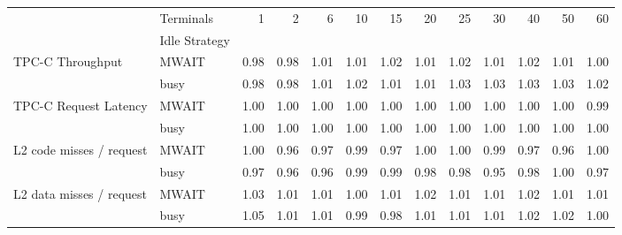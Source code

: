 \begin{tabular}{llrrrrrrrrrrr}
\toprule
                 & Terminals &    1  &    2  &    6  &    10 &    15 &    20 &    25 &    30 &    40 &    50 &    60 \\
{} & Idle Strategy &       &       &       &       &       &       &       &       &       &       &       \\
\midrule
TPC-C Throughput & MWAIT &  0.98 &  0.98 &  1.01 &  1.01 &  1.02 &  1.01 &  1.02 &  1.01 &  1.02 &  1.01 &  1.00 \\
                 & busy &  0.98 &  0.98 &  1.01 &  1.02 &  1.01 &  1.01 &  1.03 &  1.03 &  1.03 &  1.03 &  1.02 \\
TPC-C Request Latency & MWAIT &  1.00 &  1.00 &  1.00 &  1.00 &  1.00 &  1.00 &  1.00 &  1.00 &  1.00 &  1.00 &  0.99 \\
                 & busy &  1.00 &  1.00 &  1.00 &  1.00 &  1.00 &  1.00 &  1.00 &  1.00 &  1.00 &  1.00 &  1.00 \\
L2 code misses / request & MWAIT &  1.00 &  0.96 &  0.97 &  0.99 &  0.97 &  1.00 &  1.00 &  0.99 &  0.97 &  0.96 &  1.00 \\
                 & busy &  0.97 &  0.96 &  0.96 &  0.99 &  0.99 &  0.98 &  0.98 &  0.95 &  0.98 &  1.00 &  0.97 \\
L2 data misses / request & MWAIT &  1.03 &  1.01 &  1.01 &  1.00 &  1.01 &  1.02 &  1.01 &  1.01 &  1.02 &  1.01 &  1.01 \\
                 & busy &  1.05 &  1.01 &  1.01 &  0.99 &  0.98 &  1.01 &  1.01 &  1.01 &  1.02 &  1.02 &  1.00 \\
\bottomrule
\end{tabular}
